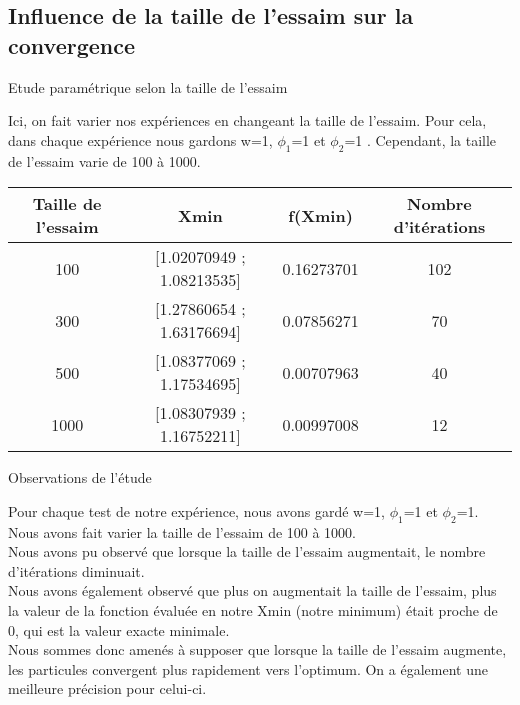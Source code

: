 \documentclass{beamer}
\begin{document}
\subsection{Influence de la taille de l’essaim sur la convergence }
  \begin{frame}{Etude paramétrique selon la taille de l'essaim}
    \begin{block}{}
      \small Ici, on fait varier nos expériences en changeant la taille de l'essaim. Pour cela, dans chaque expérience nous gardons w=1, $\phi_1$=1 et $\phi_2$=1 . Cependant, la taille de l'essaim varie de 100 à 1000.
    \end{block}\pause
    \vspace{0.8 cm}
    \begin{tabular}{|c|c|c|c|}
      \hline
      \scriptsize Taille de l'essaim &\scriptsize  Xmin &\scriptsize f(Xmin) &\scriptsize Nombre d'itérations \\
\hline
      \scriptsize 100 &\scriptsize [1.02070949 ; 1.08213535] &\scriptsize 0.16273701 &\scriptsize 102\\
\hline
      \scriptsize 300 &\scriptsize [1.27860654 ; 1.63176694] &\scriptsize 0.07856271 & \scriptsize 70 \\
\hline
      \scriptsize 500 &\scriptsize [1.08377069 ; 1.17534695] &\scriptsize 0.00707963 &\scriptsize 40 \\
\hline
      \scriptsize 1000 &\scriptsize [1.08307939 ; 1.16752211] &\scriptsize 0.00997008 &\scriptsize 12 \\
      \hline
    \end{tabular}
  \end{frame}

  \begin{frame}{Observations de l'étude }
    \begin{block}{}
      Pour chaque test de notre expérience, nous avons gardé w=1,  $\phi_1$=1 et $\phi_2$=1. Nous avons fait varier la taille de l'essaim de 100 à 1000. \\
      Nous avons pu observé que lorsque la taille de l'essaim augmentait, le nombre d'itérations diminuait. \\
      Nous avons également observé que plus on augmentait la taille de l'essaim, plus la valeur de la fonction évaluée en notre Xmin (notre minimum) était proche de 0, qui est la valeur exacte minimale. \\
      Nous sommes donc amenés à supposer que lorsque la taille de l'essaim augmente, les particules convergent plus rapidement vers l'optimum. On a également une meilleure précision pour celui-ci.
    \end{block}
  \end{frame}
\end{document}
